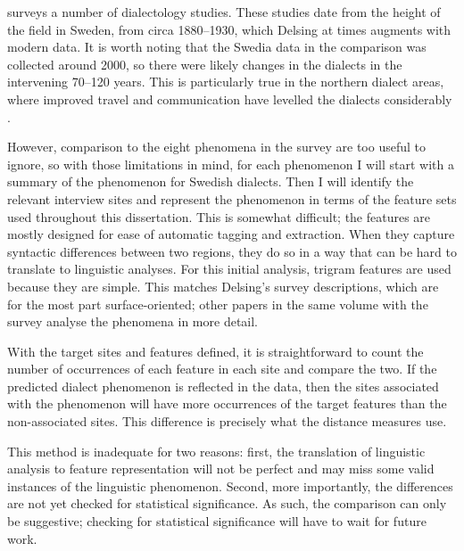  surveys a number of dialectology studies. These
studies date from the height of the field in Sweden, from circa
1880--1930, which Delsing at times augments with modern data. It is
worth noting that the Swedia data in the comparison was collected
around 2000, so there were likely changes in the dialects in the
intervening 70--120 years. This is particularly true in the northern
dialect areas, where improved travel and communication have
levelled the dialects considerably \cite{hallberg05}.

However, comparison to the eight phenomena in the survey are too
useful to ignore, so with those limitations in mind, for each
phenomenon I will start with a summary of the phenomenon for Swedish
dialects. Then I will identify the relevant interview sites and
represent the phenomenon in terms of the feature sets used throughout
this dissertation. This is somewhat difficult; the features are mostly
designed for ease of automatic tagging and extraction. When they
capture syntactic differences between two regions, they do so in a way
that can be hard to translate to linguistic analyses. For this initial
analysis, trigram features are used because they are simple. This
matches Delsing's survey descriptions, which are for the most part
surface-oriented; other papers in the same volume with the survey
analyse the phenomena in more detail.

With the target sites and features defined, it is straightforward to count the
number of occurrences of each feature in each site and compare the
two. If the predicted dialect phenomenon is reflected in the data,
then the sites associated with the phenomenon will have more
occurrences of the target features than the non-associated sites. This
difference is precisely what the distance measures use.

This method is inadequate for two reasons: first, the translation of
linguistic analysis to feature representation will not be perfect and
may miss some valid instances of the linguistic phenomenon. Second,
more importantly, the differences are not yet checked for statistical
significance. As such, the comparison can only be suggestive;
checking for statistical significance will have to wait for future
work.


